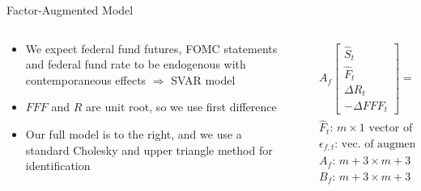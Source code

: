 \documentclass[9pt]{beamer}
\begin{document}
	\begin{frame}{Factor-Augmented Model}
	
	\begin{columns}
		\begin{column}{0.48\textwidth}
			\begin{itemize}
				\item We expect federal fund futures, FOMC statements and federal fund rate to be endogenous with contemporaneous effects \quad \quad \quad$\Rightarrow$ SVAR model
				\item $FFF$ and $R$ are unit root, so we use first difference
				\item Our full model is to the right, and we use a standard Cholesky and upper triangle method for identification
			\end{itemize}
		\end{column}
		\begin{column}{0.5\textwidth}
				\scriptsize\begin{align}
				&A_f\begin{bmatrix}
				\hat{S}_t\\
				\hat{F}_t\\
				\Delta R_t\\
				-\Delta FFF_t
				\end{bmatrix} =
				B_f\begin{bmatrix}
				\hat{S}_{t-1}\\
				\hat{F}_{t-1}\\
				\Delta R_{t-1}\\
				\Delta FFF_{t-1}
				\end{bmatrix} + \epsilon_{f,t} \nonumber \\
				&\hat{F}_t\text{: $m \times 1$ vector of factors} \nonumber \\
				&\epsilon_{f,t}\text{: vec. of augmented, structural innovations} \nonumber \\
				&A_f\text{: $m+3\times m+3$ square matrix of contemp. coeff.} \nonumber \\
				&B_f\text{: $m+3\times m+3$ square matrix of lag coeff.} \nonumber
				\end{align}
			\end{column}
		\end{columns}
	\end{frame}
\end{document}
